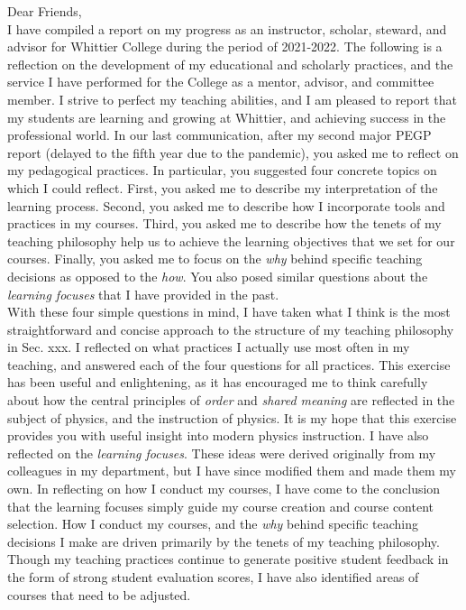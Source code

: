 \documentclass[../../main.tex]{subfiles}
\begin{document}
Dear Friends,
\\
\vspace{0.15cm}
I have compiled a report on my progress as an instructor, scholar, steward, and advisor for Whittier College during the period of 2021-2022.  The following is a reflection on the development of my educational and scholarly practices, and the service I have performed for the College as a mentor, advisor, and committee member. I strive to perfect my teaching abilities, and I am pleased to report that my students are learning and growing at Whittier, and achieving success in the professional world.  In our last communication, after my second major PEGP report (delayed to the fifth year due to the pandemic), you asked me to reflect on my pedagogical practices.  In particular, you suggested four concrete topics on which I could reflect.  First, you asked me to describe my interpretation of the learning process.  Second, you asked me to describe how I incorporate tools and practices in my courses.  Third, you asked me to describe how the tenets of my teaching philosophy help us to achieve the learning objectives that we set for our courses.  Finally, you asked me to focus on the \textit{why} behind specific teaching decisions as opposed to the \textit{how}.  You also posed similar questions about the \textit{learning focuses} that I have provided in the past.
\\
\vspace{0.25cm}
With these four simple questions in mind, I have taken what I think is the most straightforward and concise approach to the structure of my teaching philosophy in Sec. xxx.  I reflected on what practices I actually use most often in my teaching, and answered each of the four questions for all practices.  This exercise has been useful and enlightening, as it has encouraged me to think carefully about how the central principles of \textit{order} and \textit{shared meaning} are reflected in the subject of physics, and the instruction of physics.  It is my hope that this exercise provides you with useful insight into modern physics instruction.  I have also reflected on the \textit{learning focuses}.  These ideas were derived originally from my colleagues in my department, but I have since modified them and made them my own.  In reflecting on how I conduct my courses, I have come to the conclusion that the learning focuses simply guide my course creation and course content selection.  How I conduct my courses, and the \textit{why} behind specific teaching decisions I make are driven primarily by the tenets of my teaching philosophy.  Though my teaching practices continue to generate positive student feedback in the form of strong student evaluation scores, I have also identified areas of courses that need to be adjusted.
\end{document}
